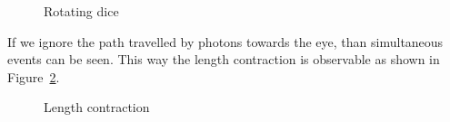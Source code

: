 \documentclass{egpubl}
\begin{document}
\begin{figure}[h]
\center
{}
\caption{Rotating dice}
\label{fig:RotatingDice}
\end{figure}

If we ignore the path travelled by photons towards the eye, than simultaneous events can be seen. This way the length contraction is observable as shown in Figure~\ref{fig:lengthContraction}.

\begin{figure}[h]
\center
{}
\caption{Length contraction}
\label{fig:lengthContraction}
\end{figure}
\end{document}

